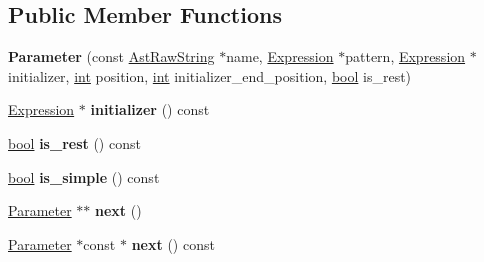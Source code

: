 \subsection*{Public Member Functions}
\begin{DoxyCompactItemize}
\item 
\mbox{\label{structv8_1_1internal_1_1ParserFormalParameters_1_1Parameter_a5a418aa441dff6901c02dff3194f7631}} 
{\bfseries Parameter} (const \mbox{\hyperlink{classv8_1_1internal_1_1AstRawString}{Ast\+Raw\+String}} $\ast$name, \mbox{\hyperlink{classv8_1_1internal_1_1Expression}{Expression}} $\ast$pattern, \mbox{\hyperlink{classv8_1_1internal_1_1Expression}{Expression}} $\ast$initializer, \mbox{\hyperlink{classint}{int}} position, \mbox{\hyperlink{classint}{int}} initializer\+\_\+end\+\_\+position, \mbox{\hyperlink{classbool}{bool}} is\+\_\+rest)
\item 
\mbox{\label{structv8_1_1internal_1_1ParserFormalParameters_1_1Parameter_a0bac99f92a951d3c42c063b25917fa4b}} 
\mbox{\hyperlink{classv8_1_1internal_1_1Expression}{Expression}} $\ast$ {\bfseries initializer} () const
\item 
\mbox{\label{structv8_1_1internal_1_1ParserFormalParameters_1_1Parameter_a2300f5aab15bc957efca061f8c9e18e5}} 
\mbox{\hyperlink{classbool}{bool}} {\bfseries is\+\_\+rest} () const
\item 
\mbox{\label{structv8_1_1internal_1_1ParserFormalParameters_1_1Parameter_a17eb7b724d5d6289f5f550af0cbcbf81}} 
\mbox{\hyperlink{classbool}{bool}} {\bfseries is\+\_\+simple} () const
\item 
\mbox{\label{structv8_1_1internal_1_1ParserFormalParameters_1_1Parameter_a1f79d8d09b5633530f64f830d776ea4a}} 
\mbox{\hyperlink{structv8_1_1internal_1_1ParserFormalParameters_1_1Parameter}{Parameter}} $\ast$$\ast$ {\bfseries next} ()
\item 
\mbox{\label{structv8_1_1internal_1_1ParserFormalParameters_1_1Parameter_a7af533ba03812fdaff367e397b6fc7e1}} 
\mbox{\hyperlink{structv8_1_1internal_1_1ParserFormalParameters_1_1Parameter}{Parameter}} $\ast$const  $\ast$ {\bfseries next} () const
\end{DoxyCompactItemize}
